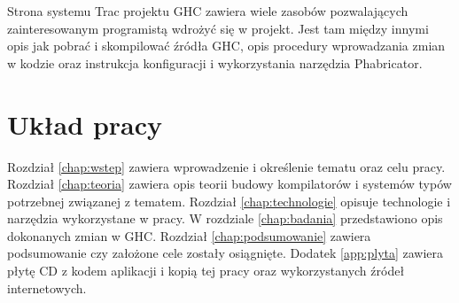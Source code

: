 Strona systemu Trac projektu GHC zawiera wiele zasobów pozwalających zainteresowanym programistą wdrożyć się w projekt. Jest tam między innymi opis jak pobrać i skompilować źródła GHC\cite{WikiNewcomers}, opis procedury wprowadzania zmian w kodzie\cite{WikiFixingBugs} oraz instrukcja konfiguracji i wykorzystania narzędzia Phabricator\cite{WikiPhabricator}.


\section{Układ pracy}\label{sec:uklad_pracy}

Rozdział \ref{chap:wstep} zawiera wprowadzenie i określenie tematu oraz celu pracy. Rozdział \ref{chap:teoria} zawiera opis teorii budowy kompilatorów i systemów typów potrzebnej związanej z tematem. Rozdział \ref{chap:technologie} opisuje technologie i narzędzia wykorzystane w pracy. W rozdziale \ref{chap:badania} przedstawiono opis dokonanych zmian w GHC. Rozdział \ref{chap:podsumowanie} zawiera podsumowanie czy założone cele zostały osiągnięte. Dodatek \ref{app:plyta} zawiera płytę CD z kodem aplikacji i kopią tej pracy oraz wykorzystanych źródeł internetowych.

